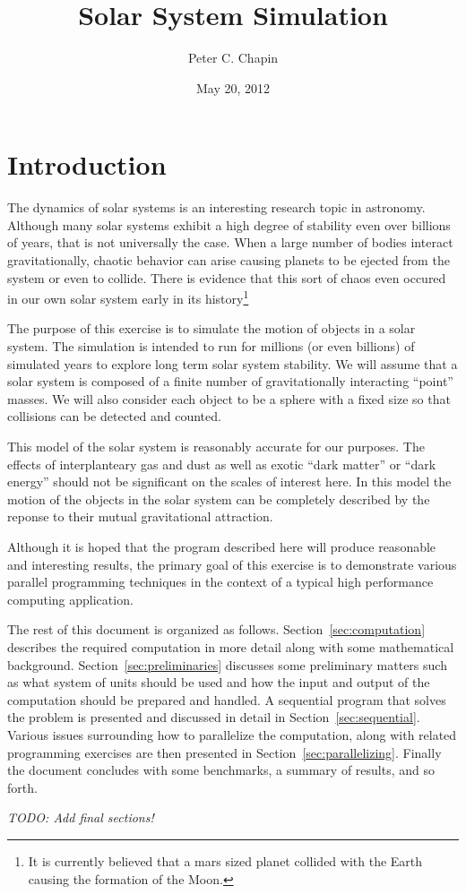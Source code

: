 \documentclass{article}
\begin{document}
\title{Solar System Simulation}
\author{Peter C. Chapin}
\date{May 20, 2012}
\maketitle

\section{Introduction}
\label{sec:introduction}

The dynamics of solar systems is an interesting research topic in astronomy. Although many solar
systems exhibit a high degree of stability even over billions of years, that is not universally
the case. When a large number of bodies interact gravitationally, chaotic behavior can arise
causing planets to be ejected from the system or even to collide. There is evidence that this
sort of chaos even occured in our own solar system early in its history\footnote{It is currently
  believed that a mars sized planet collided with the Earth causing the formation of the Moon.}

The purpose of this exercise is to simulate the motion of objects in a solar system. The
simulation is intended to run for millions (or even billions) of simulated years to explore long
term solar system stability. We will assume that a solar system is composed of a finite number
of gravitationally interacting ``point'' masses. We will also consider each object to be a
sphere with a fixed size so that collisions can be detected and counted.

This model of the solar system is reasonably accurate for our purposes. The effects of
interplanteary gas and dust as well as exotic ``dark matter'' or ``dark energy'' should not be
significant on the scales of interest here. In this model the motion of the objects in the solar
system can be completely described by the reponse to their mutual gravitational attraction.

Although it is hoped that the program described here will produce reasonable and interesting
results, the primary goal of this exercise is to demonstrate various parallel programming
techniques in the context of a typical high performance computing application.

The rest of this document is organized as follows. Section~\ref{sec:computation} describes the
required computation in more detail along with some mathematical background.
Section~\ref{sec:preliminaries} discusses some preliminary matters such as what system of units
should be used and how the input and output of the computation should be prepared and handled. A
sequential program that solves the problem is presented and discussed in detail in
Section~\ref{sec:sequential}. Various issues surrounding how to parallelize the computation,
along with related programming exercises are then presented in Section~\ref{sec:parallelizing}.
Finally the document concludes with some benchmarks, a summary of results, and so forth.






\textit{TODO: Add final sections!}
\end{document}
